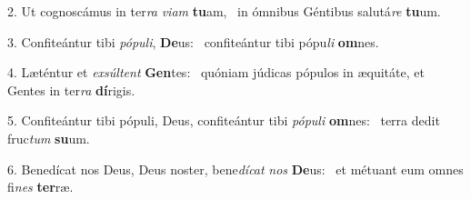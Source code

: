 2. Ut cognoscámus in ter\textit{ra} \textit{vi}\textit{am} \textbf{tu}am, \ast\  in ómnibus Géntibus salutá\textit{re} \textbf{tu}um.\

3. Confiteántur tibi \textit{pó}\textit{pu}\textit{li}, \textbf{De}us: \ast\  confiteántur tibi pópu\textit{li} \textbf{om}nes.\

4. Læténtur et \textit{ex}\textit{súl}\textit{tent} \textbf{Gen}tes: \ast\  quóniam júdicas pópulos in æquitáte, et Gentes in ter\textit{ra} \textbf{dí}rigis.\

5. Confiteántur tibi pópuli, Deus, confiteántur tibi \textit{pó}\textit{pu}\textit{li} \textbf{om}nes: \ast\  terra dedit fruc\textit{tum} \textbf{su}um.\

6. Benedícat nos Deus, Deus noster, bene\textit{dí}\textit{cat} \textit{nos} \textbf{De}us: \ast\  et métuant eum omnes fi\textit{nes} \textbf{ter}ræ.\

